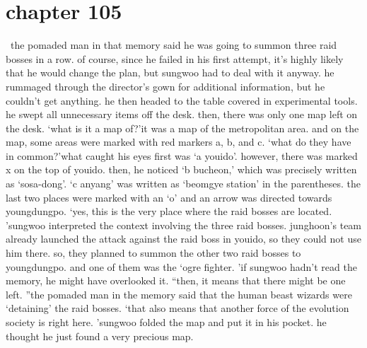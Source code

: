\section{chapter 105}






 the pomaded man in that memory said he was going to summon three raid bosses in a row.
of course, since he failed in his first attempt, it’s highly likely that he would change the plan, but sungwoo had to deal with it anyway.
he rummaged through the director’s gown for additional information, but he couldn’t get anything.
 he then headed to the table covered in experimental tools.
 he swept all unnecessary items off the desk.
then, there was only one map left on the desk.
‘what is it a map of?’it was a map of the metropolitan area.
 and on the map, some areas were marked with red markers a, b, and c.
‘what do they have in common?’what caught his eyes first was ‘a youido’.
 however, there was marked x on the top of youido.
then, he noticed ‘b bucheon,’ which was precisely written as ‘sosa-dong’.
 ‘c anyang’ was written as ‘beomgye station’ in the parentheses.
 the last two places were marked with an ‘o’ and an arrow was directed towards youngdungpo.
‘yes, this is the very place where the raid bosses are located.
’sungwoo interpreted the context involving the three raid bosses.
junghoon’s team already launched the attack against the raid boss in youido, so they could not use him there.
 so, they planned to summon the other two raid bosses to youngdungpo.
and one of them was the ‘ogre fighter.
’if sungwoo hadn’t read the memory, he might have overlooked it.
“then, it means that there might be one left.
”the pomaded man in the memory said that the human beast wizards were ‘detaining’ the raid bosses.
‘that also means that another force of the evolution society is right here.
’sungwoo folded the map and put it in his pocket.
he thought he just found a very precious map.

